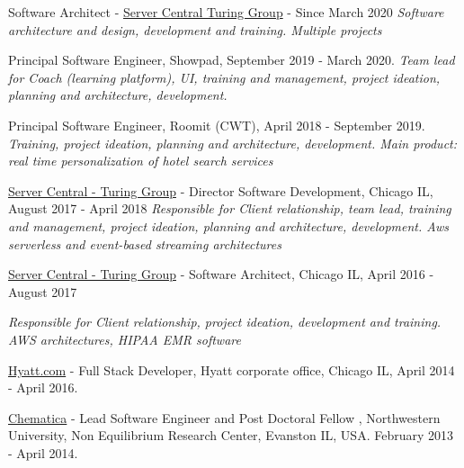 \documentclass[11pt,letterpaper]{article}
\renewenvironment{itemize}{
  \begin{list}{}{
    \setlength{\leftmargin}{1.5em}
  }
}{
  \end{list}
}
\begin{document}
\begin{itemize}
% 
\item Software Architect - \href{https://www.servercentral.com}{Server Central Turing Group} - Since March 2020 
\textit{Software architecture and design, development and training. Multiple projects}

\item Principal Software Engineer, Showpad,  September 2019 - March 2020. 
\textit{Team lead for Coach (learning platform), UI, training and management, project ideation, planning and architecture, development.}

\item Principal Software Engineer, Roomit (CWT),  April 2018 - September 2019. 
\textit{Training, project ideation, planning and architecture, development. Main product: real time personalization of hotel search services}

\item \href{http://www.turinggroup.com}{Server Central - Turing Group} - Director Software Development,  Chicago  IL, August 2017 - April 2018 
\textit{Responsible for Client relationship, team lead, training and management, project ideation, planning and architecture, development. Aws serverless and event-based streaming architectures}

\item \href{http://www.turinggroup.com}{Server Central - Turing Group} - Software Architect,  Chicago  IL, April 2016 - August 2017 

\textit{Responsible for Client relationship, project ideation, development and training.  AWS architectures, HIPAA EMR software}
\item \href{http://www.hyatt.com}{Hyatt.com} -  Full Stack Developer, Hyatt corporate office,  Chicago  IL, April 2014 - April 2016. 
\item \href{http://www.chematica.net}{Chematica} - Lead Software Engineer and Post Doctoral Fellow , Northwestern University, Non Equilibrium Research Center, Evanston IL, USA. February 2013 - April 2014.

% 
\end{itemize}
\end{document}
